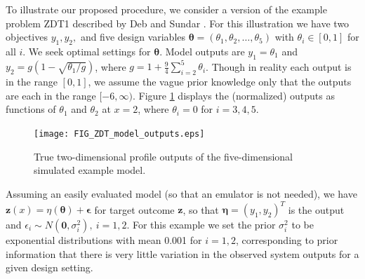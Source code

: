\documentclass[twocolumn,10pt]{asme2ej}
\begin{document}
%
To illustrate our proposed procedure, we consider a version of the example problem ZDT1 described by Deb and Sundar \cite{Deb2006a}.
%
For this illustration we have two objectives $y_1, y_2,$ and five design variables $\boldsymbol\theta=(\theta_1,\theta_2,\ldots,\theta_5)$ with $\theta_i\in[0,1]$ for all $i$.
% 
We seek optimal settings for $\boldsymbol\theta$.
%
Model outputs are $y_1 = \theta_1$ and $y_2 = g(1-\sqrt{\theta_1/g})$, where $g=1 + \frac{9}{4}\sum_{i=2}^5\theta_i$.
%
Though in reality each output is in the range $[0,1]$, we assume the vague prior knowledge only that the outputs are each in the range $[-6,\infty)$.
%
Figure \ref{fig:toy_sim_outputs} displays the (normalized) outputs as functions of $\theta_1$ and $\theta_2$ at $x = 2$, where $\theta_i=0$ for $i=3,4,5$.
%
\begin{figure}
	\centering
	\texttt{[image: FIG\_ZDT\_model\_outputs.eps]}
	\caption{True two-dimensional profile outputs of the five-dimensional simulated example model.}
	\label{fig:toy_sim_outputs}
\end{figure}
%
Assuming an easily evaluated model (so that an emulator is not needed), we have
%
$
\mathbf z(x) = \eta(\boldsymbol \theta) + \boldsymbol\epsilon
$
%
for target outcome $\mathbf z$, so that  $\boldsymbol\eta = (y_1,y_2)^T$ is the output and $\epsilon_i\sim N(\mathbf 0,\sigma_i^2), ~i=1,2$.
%
For this example we set the prior $\sigma^2_i$ to be exponential distributions with mean 0.001 for $i=1,2$, corresponding to prior information that there is very little variation in the observed system outputs for a given design setting.
%
\end{document}
